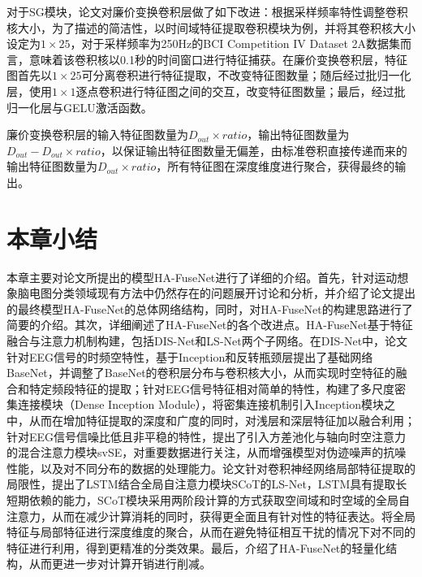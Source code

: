 对于SG模块，论文对廉价变换卷积层做了如下改进：根据采样频率特性调整卷积核大小，为了描述的简洁性，以时间域特征提取卷积模块为例，并将其卷积核大小设定为\(1 \times 25\)，对于采样频率为250Hz的BCI Competition IV Dataset 2A数据集而言，意味着该卷积核以0.1秒的时间窗口进行特征捕获。在廉价变换卷积层，特征图首先以\(1 \times 25\)可分离卷积进行特征提取，不改变特征图数量；随后经过批归一化层，使用\(1 \times 1\)逐点卷积进行特征图之间的交互，改变特征图数量；最后，经过批归一化层与GELU激活函数。

廉价变换卷积层的输入特征图数量为\(D_{out} \times ratio\)，输出特征图数量为\(D_{out}-D_{out} \times ratio\)，以保证输出特征图数量无偏差，由标准卷积直接传递而来的输出特征图数量为\(D_{out} \times ratio\)，所有特征图在深度维度进行聚合，获得最终的输出。

\section{本章小结}

本章主要对论文所提出的模型HA-FuseNet进行了详细的介绍。首先，针对运动想象脑电图分类领域现有方法中仍然存在的问题展开讨论和分析，并介绍了论文提出的最终模型HA-FuseNet的总体网络结构，同时，对HA-FuseNet的构建思路进行了简要的介绍。其次，详细阐述了HA-FuseNet的各个改进点。HA-FuseNet基于特征融合与注意力机制构建，包括DIS-Net和LS-Net两个子网络。在DIS-Net中，论文针对EEG信号的时频空特性，基于Inception和反转瓶颈层提出了基础网络BaseNet，并调整了BaseNet的卷积层分布与卷积核大小，从而实现时空特征的融合和特定频段特征的提取；针对EEG信号特征相对简单的特性，构建了多尺度密集连接模块（Dense Inception Module），将密集连接机制引入Inception模块之中，从而在增加特征提取的深度和广度的同时，对浅层和深层特征加以融合利用；针对EEG信号信噪比低且非平稳的特性，提出了引入方差池化与轴向时空注意力的混合注意力模块svSE，对重要数据进行关注，从而增强模型对伪迹噪声的抗噪性能，以及对不同分布的数据的处理能力。论文针对卷积神经网络局部特征提取的局限性，提出了LSTM结合全局自注意力模块SCoT的LS-Net，LSTM具有提取长短期依赖的能力，SCoT模块采用两阶段计算的方式获取空间域和时空域的全局自注意力，从而在减少计算消耗的同时，获得更全面且有针对性的特征表达。将全局特征与局部特征进行深度维度的聚合，从而在避免特征相互干扰的情况下对不同的特征进行利用，得到更精准的分类效果。最后，介绍了HA-FuseNet的轻量化结构，从而更进一步对计算开销进行削减。

